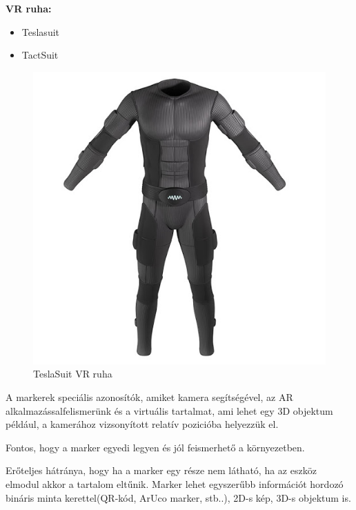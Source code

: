 {\bf VR ruha:}
\begin{itemize}
\item Teslasuit
\item TactSuit
\end{itemize}

\begin{figure}[htp]
    \centering
   	\includegraphics[width=5truecm, height=3.8truecm]{images/tesla.jpg}
	\caption{TeslaSuit VR ruha}
\end{figure}



A markerek speciális azonosítók, amiket kamera segítségével, az AR alkalmazássalfelismerünk és a virtuális tartalmat, ami lehet egy  3D objektum például, a kamerához vizsonyított relatív pozicióba helyezzük el. 

Fontos, hogy a marker egyedi legyen és jól feismerhető a környezetben. 

Erőteljes hátránya, hogy ha a marker egy része nem látható, ha az eszköz elmodul akkor a tartalom eltűnik.
Marker lehet egyszerűbb információt hordozó bináris minta kerettel(QR-kód, ArUco marker, stb..), 2D-s kép, 3D-s objektum is.


